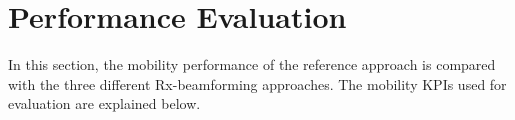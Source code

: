 \documentclass[10pt, conference]{IEEEtran}
\begin{document}

%
\section{Performance Evaluation}  \label{Section5}
In this section, the mobility performance of the reference approach is compared with the three different Rx-beamforming approaches. The mobility KPIs used for evaluation are explained below.

%
\end{document}
